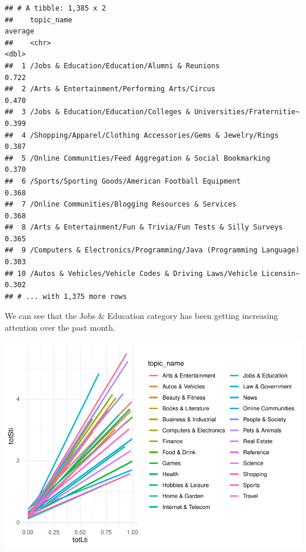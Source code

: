 \documentclass[]{article}
\newenvironment{Shaded}{\begin{snugshade}}{\end{snugshade}}
\newcommand{\DataTypeTok}[1]{\textcolor[rgb]{0.13,0.29,0.53}{#1}}
\newcommand{\KeywordTok}[1]{\textcolor[rgb]{0.13,0.29,0.53}{\textbf{#1}}}
\newcommand{\NormalTok}[1]{#1}
\newcommand{\OperatorTok}[1]{\textcolor[rgb]{0.81,0.36,0.00}{\textbf{#1}}}
\newcommand{\OtherTok}[1]{\textcolor[rgb]{0.56,0.35,0.01}{#1}}
\newcommand{\StringTok}[1]{\textcolor[rgb]{0.31,0.60,0.02}{#1}}
\begin{document}
\begin{verbatim}
## # A tibble: 1,385 x 2
##    topic_name                                                       average
##    <chr>                                                              <dbl>
##  1 /Jobs & Education/Education/Alumni & Reunions                      0.722
##  2 /Arts & Entertainment/Performing Arts/Circus                       0.470
##  3 /Jobs & Education/Education/Colleges & Universities/Fraternitie~   0.399
##  4 /Shopping/Apparel/Clothing Accessories/Gems & Jewelry/Rings        0.387
##  5 /Online Communities/Feed Aggregation & Social Bookmarking          0.370
##  6 /Sports/Sporting Goods/American Football Equipment                 0.368
##  7 /Online Communities/Blogging Resources & Services                  0.368
##  8 /Arts & Entertainment/Fun & Trivia/Fun Tests & Silly Surveys       0.365
##  9 /Computers & Electronics/Programming/Java (Programming Language)   0.303
## 10 /Autos & Vehicles/Vehicle Codes & Driving Laws/Vehicle Licensin~   0.302
## # ... with 1,375 more rows
\end{verbatim}

We can see that the Jobs \& Education category has been getting
increasing attention over the past month.

\begin{Shaded}
\end{Shaded}

\includegraphics{Final-Report_files/figure-latex/scatter-plot-1.pdf}
\end{document}

